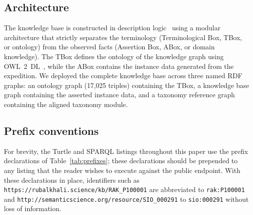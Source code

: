 \documentclass[11pt,a4paper]{article}
\begin{document}
\subsection{Architecture}

The knowledge base is constructed in description
logic~\cite{dlhandbook} using a modular architecture that strictly
separates the terminology (Terminological Box, TBox, or ontology) from
the observed facts (Assertion Box, ABox, or domain knowledge). The
TBox defines the ontology of the knowledge graph using
OWL~2~DL~\cite{owl2}, while the ABox contains the instance data
generated from the expedition. We deployed the complete knowledge
base across three named RDF graphs: an ontology graph (17{,}025
triples) containing the TBox, a knowledge base graph containing the
asserted instance data, and a taxonomy reference graph containing the
aligned taxonomy module.

\subsection{Prefix conventions}\label{subsec:prefixes}

For brevity, the Turtle and SPARQL listings throughout this paper use
the prefix declarations of Table~\ref{tab:prefixes}; these
declarations should be prepended to any listing that the reader
wishes to execute against the public endpoint. With these
declarations in place, identifiers such as
\texttt{https://rubalkhali.science/kb/RAK\_P100001} are abbreviated to
\texttt{rak:P100001} and
\texttt{http://semanticscience.org/resource/SIO\_000291} to
\texttt{sio:000291} without loss of information.
\end{document}

